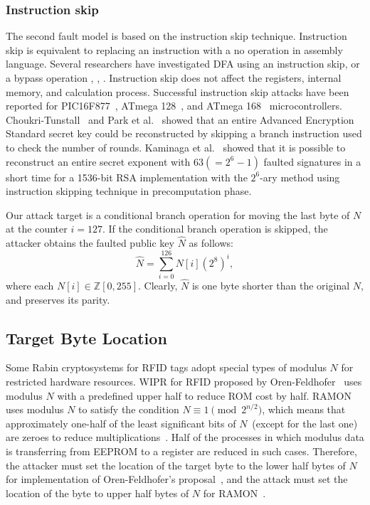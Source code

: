 \documentclass{article}
\begin{document}
\subsubsection{Instruction skip}
The second fault model is based on the instruction skip technique. 
Instruction skip is equivalent to replacing an instruction with a no operation 
in assembly language.
Several researchers have investigated DFA using an instruction skip, or a bypass operation 
\cite{RoundReduction}, \cite{park}, \cite{yoshikawa1}. 
Instruction skip does not affect the registers, internal memory, and calculation process.
Successful instruction skip attacks have been reported for 
PIC16F877~\cite{RoundReduction}, ATmega 128~\cite{park}, 
and ATmega 168~\cite{yoshikawa1} microcontrollers. 
Choukri-Tunstall~\cite{RoundReduction} and Park et al.~\cite{park} showed that 
an entire Advanced Encryption Standard secret key could be 
reconstructed by skipping a branch instruction used to 
check the number of rounds. 
Kaminaga et al.~\cite{KYS2015IEEE} showed that it is possible to 
reconstruct an entire secret exponent with $63(=2^6-1)$ 
faulted signatures in a short time for a 1536-bit RSA implementation with the 
$2^6$-ary method using instruction skipping technique in precomputation phase.


Our attack target is a conditional branch operation for moving 
the last byte of $N$ at the counter $i=127$.
If the conditional branch operation is 
skipped, the attacker obtains the faulted public key $\hat{N}$ as follows:
$$
\hat{N} = \sum_{i=0}^{126}N[i](2^8)^i,
$$
where each $N[i]\in \mathbb{Z}[0,255]$.
Clearly, $\hat{N}$ is one byte shorter than the original $N$, and preserves its parity.

\subsection{Target Byte Location}
Some Rabin cryptosystems for RFID tags adopt special types of modulus $N$ for restricted hardware resources.
WIPR for RFID proposed by Oren-Feldhofer~\cite{Oren-Feldhofer2} uses 
modulus $N$ with a predefined upper half to reduce ROM cost by half.
RAMON uses modulus $N$ to satisfy the condition $N\equiv 1\pmod{2^{n/2}}$, which means 
that approximately one-half of the least significant bits of $N$~(except for the last one) are zeroes 
to reduce multiplications~\cite{RAMON}.
Half of the processes in which modulus data is transferring from EEPROM to a register are reduced in 
such cases.
Therefore, the attacker must set the location of the target byte to the lower half bytes of $N$ 
for implementation of 
Oren-Feldhofer's proposal~\cite{Oren-Feldhofer2}, and the attack must set the 
location of the byte to upper half bytes of $N$ for RAMON~\cite{RAMON}.
\end{document}
